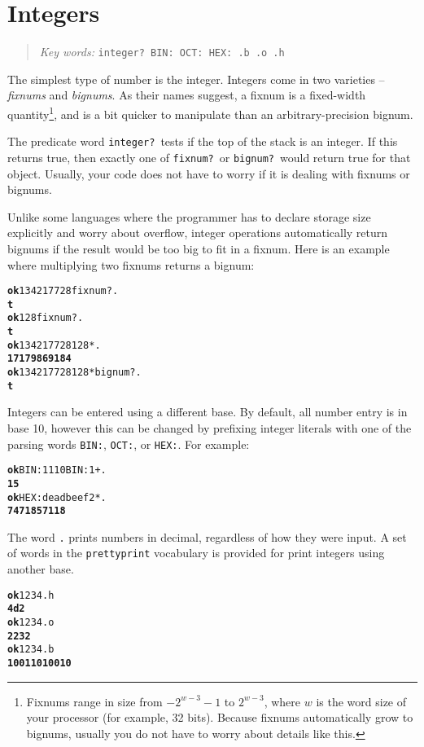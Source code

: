 \documentclass[english]{book}
\newcommand{\chapkeywords}[1]{{\parbox{10cm}{\begin{minipage}[b]{10cm}
\begin{quote}
\emph{Key words:} \texttt{#1}
\end{quote}
\end{minipage}}}}
\begin{document}
\section{Integers}

\chapkeywords{integer?~BIN: OCT: HEX: .b .o .h}

The simplest type of number is the integer. Integers come in two varieties -- \emph{fixnums} and \emph{bignums}. As their names suggest, a fixnum is a fixed-width quantity\footnote{Fixnums range in size from $-2^{w-3}-1$ to $2^{w-3}$, where $w$ is the word size of your processor (for example, 32 bits). Because fixnums automatically grow to bignums, usually you do not have to worry about details like this.}, and is a bit quicker to manipulate than an arbitrary-precision bignum.

The predicate word \texttt{integer?}~tests if the top of the stack is an integer. If this returns true, then exactly one of \texttt{fixnum?}~or \texttt{bignum?}~would return true for that object. Usually, your code does not have to worry if it is dealing with fixnums or bignums.

Unlike some languages where the programmer has to declare storage size explicitly and worry about overflow, integer operations automatically return bignums if the result would be too big to fit in a fixnum. Here is an example where multiplying two fixnums returns a bignum:

\begin{alltt}
\textbf{ok} 134217728 fixnum? .
\textbf{t}
\textbf{ok} 128 fixnum? .
\textbf{t}
\textbf{ok} 134217728 128 * .
\textbf{17179869184}
\textbf{ok} 134217728 128 * bignum? .
\textbf{t}
\end{alltt}

Integers can be entered using a different base. By default, all number entry is in base 10, however this can be changed by prefixing integer literals with one of the parsing words \texttt{BIN:}, \texttt{OCT:}, or \texttt{HEX:}. For example:

\begin{alltt}
\textbf{ok} BIN: 1110 BIN: 1 + .
\textbf{15}
\textbf{ok} HEX: deadbeef 2 * .
\textbf{7471857118}
\end{alltt}

The word \texttt{.} prints numbers in decimal, regardless of how they were input. A set of words in the \texttt{prettyprint} vocabulary is provided for print integers using another base.

\begin{alltt}
\textbf{ok} 1234 .h
\textbf{4d2}
\textbf{ok} 1234 .o
\textbf{2232}
\textbf{ok} 1234 .b
\textbf{10011010010}
\end{alltt}
\end{document}
